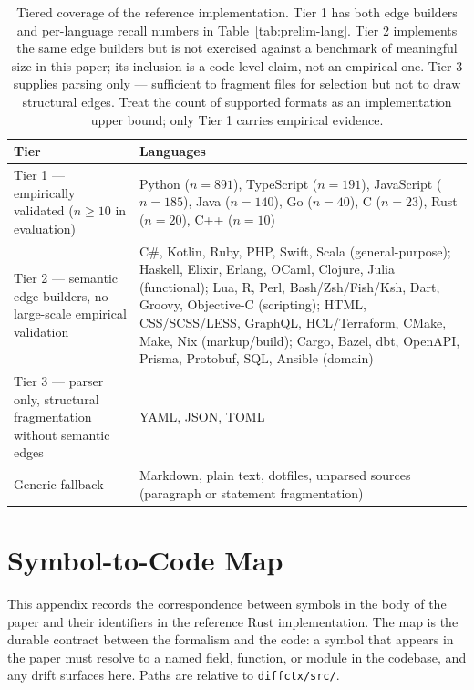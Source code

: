 \documentclass[11pt, a4paper]{article}
\begin{document}
\begin{table}[h]
\centering
\small
\begin{tabular}{lp{9.5cm}}
\toprule
\textbf{Tier} & \textbf{Languages} \\
\midrule
Tier 1 — empirically validated ($n{\geq}10$ in evaluation) &
Python ($n{=}891$), TypeScript ($n{=}191$), JavaScript ($n{=}185$),
Java ($n{=}140$), Go ($n{=}40$), C ($n{=}23$), Rust ($n{=}20$), C++ ($n{=}10$) \\
\midrule
Tier 2 — semantic edge builders, no large-scale empirical validation &
C\#, Kotlin, Ruby, PHP, Swift, Scala (general-purpose);
Haskell, Elixir, Erlang, OCaml, Clojure, Julia (functional);
Lua, R, Perl, Bash/Zsh/Fish/Ksh, Dart, Groovy, Objective-C (scripting);
HTML, CSS/SCSS/LESS, GraphQL, HCL/Terraform, CMake, Make, Nix (markup/build);
Cargo, Bazel, dbt, OpenAPI, Prisma, Protobuf, SQL, Ansible (domain) \\
\midrule
Tier 3 — parser only, structural fragmentation without semantic edges &
YAML, JSON, TOML \\
\midrule
Generic fallback &
Markdown, plain text, dotfiles, unparsed sources (paragraph or statement fragmentation) \\
\bottomrule
\end{tabular}
\caption{Tiered coverage of the reference implementation. Tier 1 has both edge builders and per-language recall numbers in Table~\ref{tab:prelim-lang}. Tier 2 implements the same edge builders but is not exercised against a benchmark of meaningful size in this paper; its inclusion is a code-level claim, not an empirical one. Tier 3 supplies parsing only — sufficient to fragment files for selection but not to draw structural edges. Treat the count of supported formats as an implementation upper bound; only Tier 1 carries empirical evidence.}
\label{tab:language-support}
\end{table}

\newpage
\section{Symbol-to-Code Map}
\label{sec:symbol-map}

This appendix records the correspondence between symbols in the body of the paper and their identifiers in the reference Rust implementation. The map is the durable contract between the formalism and the code: a symbol that appears in the paper must resolve to a named field, function, or module in the codebase, and any drift surfaces here. Paths are relative to \texttt{diffctx/src/}.
\end{document}
